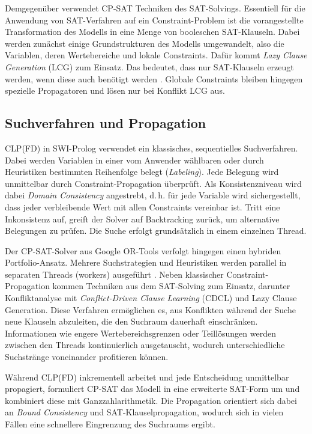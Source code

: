 \documentclass[12pt,a4paper]{article}
\begin{document}
Demgegenüber verwendet CP-SAT Techniken des SAT-Solvings.
Essentiell für die Anwendung von SAT-Verfahren auf ein Constraint-Problem ist die vorangestellte Transformation des Modells in eine Menge von booleschen SAT-Klauseln.
Dabei werden zunächst einige Grundstrukturen des Modells umgewandelt, also die Variablen, deren Wertebereiche und lokale Constraints.
Dafür kommt \emph{Lazy Clause Generation} (LCG) zum Einsatz.
Das bedeutet, dass nur SAT-Klauseln erzeugt werden, wenn diese auch benötigt werden \cite{Stuckey2010}.
Globale Constraints bleiben hingegen spezielle Propagatoren und lösen nur bei Konflikt LCG aus.



\subsection{Suchverfahren und Propagation}
\label{sec:search_prop}
CLP(FD) in SWI-Prolog verwendet ein klassisches, sequentielles Suchverfahren.
Dabei werden Variablen in einer vom Anwender wählbaren oder durch Heuristiken bestimmten Reihenfolge belegt (\emph{Labeling}).
Jede Belegung wird unmittelbar durch Constraint-Propagation überprüft.
Als Konsistenzniveau wird dabei \emph{Domain Consistency} angestrebt, d.\,h. für jede Variable wird sichergestellt, dass jeder verbleibende Wert mit allen Constraints vereinbar ist.
Tritt eine Inkonsistenz auf, greift der Solver auf Backtracking zurück, um alternative Belegungen zu prüfen.
Die Suche erfolgt grundsätzlich in einem einzelnen Thread.

Der CP-SAT-Solver aus Google OR-Tools verfolgt hingegen einen hybriden Portfolio-Ansatz.
Mehrere Suchstrategien und Heuristiken werden parallel in separaten Threads (workers) ausgeführt \cite{perron}.
Neben klassischer Constraint-Propagation kommen Techniken aus dem SAT-Solving zum Einsatz, darunter Konfliktanalyse mit \emph{Conflict-Driven Clause Learning} (CDCL) und Lazy Clause Generation.
Diese Verfahren ermöglichen es, aus Konflikten während der Suche neue Klauseln abzuleiten, die den Suchraum dauerhaft einschränken.
Informationen wie engere Wertebereichsgrenzen oder Teillösungen werden zwischen den Threads kontinuierlich ausgetauscht, wodurch unterschiedliche Suchstränge voneinander profitieren können. 

Während CLP(FD) inkrementell arbeitet und jede Entscheidung unmittelbar propagiert, formuliert CP-SAT das Modell in eine erweiterte SAT-Form um und kombiniert diese mit Ganzzahlarithmetik.
Die Propagation orientiert sich dabei an \emph{Bound Consistency} und SAT-Klauselpropagation, wodurch sich in vielen Fällen eine schnellere Eingrenzung des Suchraums ergibt.
\end{document}
